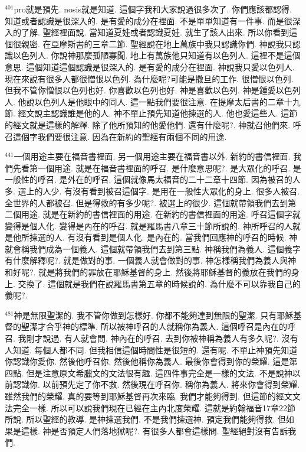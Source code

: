 \documentclass{book}
\begin{document}
$^{401}$pro就是預先.
nosis就是知道.
這個字我和大家說過很多次了.
你們應該都認得.
知道或者認識是很深入的.
是有愛的成分在裡面.
不是單單知道有一件事.
而是很深入的了解.
聖經裡面說.
當知道夏娃或者認識夏娃.
就生了該人出來.
所以你看到這個很親密.
在亞摩斯書的三章二節.
聖經說在地上萬族中我只認識你們.
神說我只認識以色列人.
你說神那麼孤陋寡聞.
地上有萬族他只知道有以色列人.
這裡不是這個意思.
這個知道這個認識是很深入的.
是有愛的成分在裡面.
神說我只愛以色列人.
現在來說有很多人都很憎恨以色列.
為什麼呢?可能是撒旦的工作.
很憎恨以色列.
但我不管你憎恨以色列也好.
你喜歡以色列也好.
神是喜歡以色列.
神是鍾愛以色列人.
他說以色列人是他眼中的同人.
這一點我們要很注意.
在提摩太后書的二章十九節.
經文說主認識誰是他的人.
神不單止預先知道他揀選的人.
他也愛這些人.
這節的經文就是這樣的解釋.
除了他所預知的他愛他們.
還有什麼呢?.
神就召他們來.
呼召這個字我們要很注意.
因為在新約的聖經有兩個不同的用途.

$^{441}$一個用途主要在福音書裡面.
另一個用途主要在福音書以外.
新約的書信裡面.
我們先看第一個用途.
就是在福音書裡面的呼召.
是什麼意思呢?.
是大眾化的呼召.
是一般性的呼召.
是外在的呼召.
這個就像馬太福音的二十二章十四節.
因為被召的人多.
選上的人少.
有沒有看到被召這個字.
是用在一般性大眾化的身上.
很多人被召.
全世界的人都被召.
但是得救的有多少呢?.
被選上的很少.
這個就帶領我們去到第二個用途.
就是在新約的書信裡面的用途.
在新約的書信裡面的用途.
呼召這個字就變得是個人化.
變得是內在的呼召.
就是羅馬書八章三十節所說的.
神所呼召的人就是他所揀選的人.
有沒有看到是個人化.
是內在的.
當我們回應神的呼召的時候.
神就會稱我們成為一個義人.
這個就帶領我們去到第三點.
神稱我們為義人.
這個義字有什麼解釋呢?.
就是做對的事.
一個義人就會做對的事.
神怎樣稱我們為義人與神和好呢?.
就是將我們的罪放在耶穌基督的身上.
然後將耶穌基督的義放在我們的身上.
交換了.
這個就是我們在說羅馬書第五章的時候說的.
為什麼不可以靠我自己的義呢?.

$^{481}$神是無限聖潔的.
我不管你做到怎樣好.
你都不能夠達到無限的聖潔.
只有耶穌基督的聖潔才合乎神的標準.
所以被神呼召的人就稱你為義人.
這個呼召是內在的呼召.
我剛才說過.
有人就會問.
神內在的呼召.
去到你被神稱為義人有多久呢?.
沒有人知道.
每個人都不同.
但我相信這個時間性是很短的.
還有呢.
不單止神預先知道你認識你愛你.
然後他呼召你.
然後他稱你為義人.
最後你會得到你的榮耀.
這是第四點.
但是注意原文希臘文的文法很有趣.
這四件事完全是一樣的文法.
不是說神以前認識你.
以前預先定了你不救.
然後現在呼召你.
稱你為義人.
將來你會得到榮耀.
雖然我們的榮耀.
真的要等到耶穌基督再次來臨.
我們才能夠得到.
但這節的經文文法完全一樣.
所以可以說我們現在已經在主內北度榮耀.
這就是約翰福音17章22節所說.
所以聖經的教導.
是神揀選我們.
不是我們揀選神.
預定我們能夠得救.
但如果是這樣.
神是否預定人們落地獄呢?.
有很多人都會這樣問.
聖經絕對沒有告訴我們.
\end{document}
